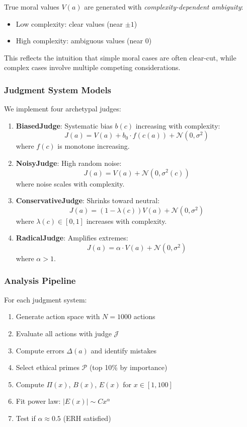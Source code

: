 \documentclass[12pt,a4paper]{article}
\theoremstyle{definition}
\theoremstyle{remark}
\begin{document}
True moral values $V(a)$ are generated with \emph{complexity-dependent ambiguity}:
\begin{itemize}
    \item Low complexity: clear values (near $\pm 1$)
    \item High complexity: ambiguous values (near $0$)
\end{itemize}

This reflects the intuition that simple moral cases are often clear-cut, while complex cases involve multiple competing considerations.

\subsubsection{Judgment System Models}

We implement four archetypal judges:

\begin{enumerate}
    \item \textbf{BiasedJudge}: Systematic bias $b(c)$ increasing with complexity:
    \[
    J(a) = V(a) + b_0 \cdot f(c(a)) + \mathcal{N}(0, \sigma^2)
    \]
    where $f(c)$ is monotone increasing.
    
    \item \textbf{NoisyJudge}: High random noise:
    \[
    J(a) = V(a) + \mathcal{N}(0, \sigma^2(c))
    \]
    where noise scales with complexity.
    
    \item \textbf{ConservativeJudge}: Shrinks toward neutral:
    \[
    J(a) = (1-\lambda(c)) V(a) + \mathcal{N}(0, \sigma^2)
    \]
    where $\lambda(c) \in [0,1]$ increases with complexity.
    
    \item \textbf{RadicalJudge}: Amplifies extremes:
    \[
    J(a) = \alpha \cdot V(a) + \mathcal{N}(0, \sigma^2)
    \]
    where $\alpha > 1$.
\end{enumerate}

\subsubsection{Analysis Pipeline}

For each judgment system:
\begin{enumerate}
    \item Generate action space with $N = 1000$ actions
    \item Evaluate all actions with judge $\mathcal{J}$
    \item Compute errors $\Delta(a)$ and identify mistakes
    \item Select ethical primes $\mathcal{P}$ (top 10\% by importance)
    \item Compute $\Pi(x)$, $B(x)$, $E(x)$ for $x \in [1, 100]$
    \item Fit power law: $|E(x)| \sim C x^\alpha$
    \item Test if $\alpha \approx 0.5$ (ERH satisfied)
\end{enumerate}
\end{document}
